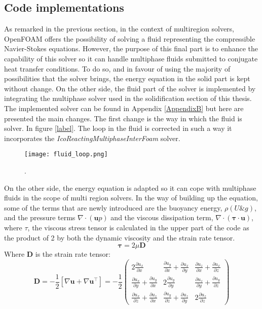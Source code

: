 \subsection{Code implementations}
As remarked in the previous section, in the context of multiregion solvers, OpenFOAM offers the possibility of solving a fluid representing the compressible Navier-Stokes equations. However, the purpose of this final part is to enhance the capability of this solver so it can handle multiphase fluids submitted to conjugate heat transfer conditions.
To do so, and in favour of using the majority of possibilities that the solver brings, the energy equation in the solid part is kept without change. On the other side, the fluid part of the solver is implemented by integrating the multiphase solver used in the solidification section of this thesis.  
The implemented solver can be found in Appendix \ref{AppendixB} but here are presented the main changes.
\newline
The first change is the way in which the fluid is solver. In figure \ref{label}. The loop in the fluid is corrected in such a way it incorporates the \textit{IcoReactingMultiphaseInterFoam} solver. 
\begin{figure}[h!]
	\centering
	\texttt{[image: fluid\_loop.png]}	
	\label{4.3fig}
	\caption{.}
\end{figure} 
\newline
On the other side, the energy equation is adapted so it can cope with multiphase fluids in the scope of multi region solvers. In the way of building up the equation, some of the terms that are newly introduced are the buoyancy energy, $\rho(U\&g)$, and the pressure terms $\nabla \cdot (\textbf{u}p)$ and the viscous dissipation term, $\nabla \cdot (\boldsymbol{\tau} \cdot \textbf{u})$, where $\tau$, the viscous stress tensor is calculated in the upper part of the code as the product of 2 by both the dynamic viscosity and the strain rate tensor.
\begin{equation}
\boldsymbol{\tau}=2 \mu \mathbf{D}
\end{equation}
Where \textbf{D} is the strain rate tensor:
\begin{equation}
	\mathbf{D}=-\frac{1}{2}\left[\nabla \mathbf{u}+\nabla \mathbf{u}^{\top}\right]=-\frac{1}{2}\left(\begin{array}{ccc}
	2 \frac{\partial u_{x}}{\partial x} & \frac{\partial u_{y}}{\partial x}+\frac{\partial u_{x}}{\partial y} & \frac{\partial u_{z}}{\partial x}+\frac{\partial u_{x}}{\partial z} \\
	\frac{\partial u_{x}}{\partial y}+\frac{\partial u_{y}}{\partial x} & 2 \frac{\partial u_{y}}{\partial y} & \frac{\partial u_{z}}{\partial y}+\frac{\partial u_{y}}{\partial z} \\
	\frac{\partial u_{x}}{\partial z}+\frac{\partial u_{z}}{\partial x} & \frac{\partial u_{y}}{\partial z}+\frac{\partial u_{z}}{\partial y} & 2 \frac{\partial u_{z}}{\partial z}
	\end{array}\right)
	\label{4.7}
\end{equation}
